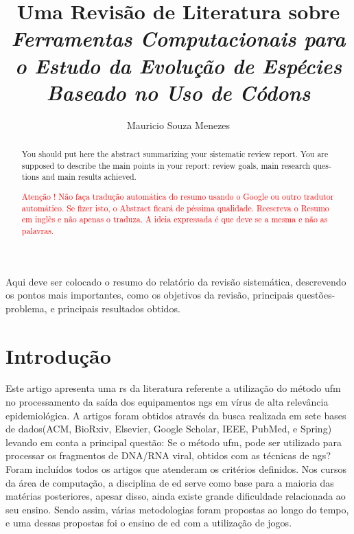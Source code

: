 \documentclass[12pt]{article}
\title{Uma Revisão de Literatura sobre \textit{Ferramentas Computacionais para o Estudo da Evolução de Espécies Baseado no Uso de Códons}}
\author{Mauricio Souza Menezes\\}
\begin{document}

\maketitle

\begin{resumo}
    Aqui deve ser colocado o resumo do relatório da revisão sistemática, descrevendo os pontos mais importantes, como os objetivos da revisão, principais questões-problema, e principais resultados obtidos.
\end{resumo}


\begin{abstract}
    \begin{otherlanguage}{english}
        You should put here the abstract summarizing your sistematic review report. You are supposed to describe the main points in your report: review goals, main research questions and main results achieved.
    \end{otherlanguage} \textcolor{red}{Atenção ! Não faça tradução automática do resumo usando o Google ou outro tradutor automático. Se fizer isto, o Abstract ficará de péssima qualidade. Reescreva o Resumo em inglês e não apenas o traduza. A ideia expressada é que deve se a mesma e não as palavras.}
\end{abstract}


\section{Introdução}

Este artigo apresenta uma \gls{rs} da literatura referente a utilização do método \gls{ufm} no processamento da saída dos equipamentos \gls{ngs} em vírus de alta relevância epidemiológica. A artigos foram obtidos através da busca realizada em sete bases de dados(ACM, BioRxiv, Elsevier, Google Scholar, IEEE, PubMed, e Spring) levando em conta a principal questão: Se o método \gls{ufm}, pode ser utilizado para processar os fragmentos de DNA/RNA viral, obtidos com as técnicas de \gls{ngs}? Foram incluídos todos os artigos que atenderam os critérios definidos.
Nos cursos da área de computação, a disciplina de \gls{ed} serve como base para a maioria das matérias posteriores, apesar disso, ainda existe grande dificuldade relacionada ao seu ensino. Sendo assim, várias metodologias foram propostas ao longo do tempo, e uma dessas propostas foi o ensino de \gls{ed} com a utilização de jogos.
\end{document}
